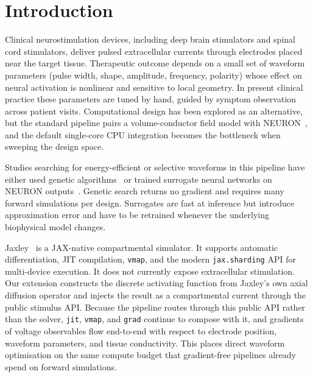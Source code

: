 
\section{Introduction}\label{sec:intro}

Clinical neurostimulation devices, including deep brain stimulators and
spinal cord stimulators, deliver pulsed extracellular currents through
electrodes placed near the target tissue. Therapeutic outcome depends on a
small set of waveform parameters (pulse width, shape, amplitude,
frequency, polarity) whose effect on neural activation is nonlinear and
sensitive to local geometry. In present clinical practice these parameters
are tuned by hand, guided by symptom observation across patient visits.
Computational design has been explored as an alternative, but the
standard pipeline pairs a volume-conductor field model with
NEURON~\cite{Hines2001NeuronAT}, and the default single-core CPU
integration becomes the bottleneck when sweeping the design space.

Studies searching for energy-efficient or selective waveforms in this
pipeline have either used genetic
algorithms~\cite{grill2015model,wongsarnpigoon2010energy} or trained
surrogate neural networks on NEURON
outputs~\cite{hussain2024efficient}. Genetic search returns no
gradient and requires many forward simulations per design. Surrogates
are fast at inference but introduce approximation error and have to be
retrained whenever the underlying biophysical model changes.

Jaxley~\cite{deistler2025jaxley} is a JAX-native compartmental
simulator. It supports automatic differentiation, JIT compilation,
\texttt{vmap}, and the modern \texttt{jax.sharding} API for
multi-device execution. It does not currently expose extracellular
stimulation. Our extension constructs the discrete activating function
from Jaxley's own axial diffusion operator and injects the result as a
compartmental current through the public stimulus API. Because the pipeline routes through this public API
rather than the solver, \texttt{jit}, \texttt{vmap}, and \texttt{grad}
continue to compose with it, and gradients of voltage observables flow
end-to-end with respect to electrode position, waveform parameters,
and tissue conductivity. This places direct waveform optimisation on
the same compute budget that gradient-free pipelines already spend on
forward simulations.

